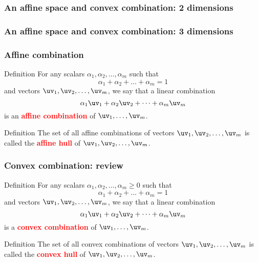 \begin{frame}
  \frametitle{An affine space and convex combination: 2 dimensions}
\end{frame}

\begin{frame}
  \frametitle{An affine space and convex combination: 3 dimensions}
\end{frame}

\begin{frame}
  \frametitle{Affine combination}
  
  \begin{block}{Definition}
    For any scalars $\alpha_1,\alpha_2,\ldots,\alpha_m$
    such that 
    \[
    \alpha_1 + \alpha_2 + \ldots + \alpha_m = 1
    \]
    and vectors $\uv_1,\uv_2,\ldots,\uv_m$, we say that a linear combination
    \[
    \alpha_1\uv_1 + \alpha_2\uv_2 + \cdots + \alpha_m \uv_m
    \]
    is an \textcolor{red}{\bf affine combination} of $\uv_1,\ldots,\uv_m$.
  \end{block}

  \pause

  \begin{block}{Definition}
    The set of all affine combinations of 
    vectors $\uv_1,\uv_2,\ldots,\uv_m$
    is called the \textcolor{red}{\bf affine hull} of
    $\uv_1,\uv_2,\ldots,\uv_m$.
  \end{block}

\end{frame}

\begin{frame}
  \frametitle{Convex combination: review}
  
  \begin{block}{Definition}
    For any scalars $\alpha_1,\alpha_2,\ldots,\alpha_m \geq 0$
    such that 
    \[
    \alpha_1 + \alpha_2 + \ldots + \alpha_m = 1
    \]
    and vectors $\uv_1,\uv_2,\ldots,\uv_m$, we say that a linear combination
    \[
    \alpha_1\uv_1 + \alpha_2\uv_2 + \cdots + \alpha_m \uv_m
    \]
    is a \textcolor{red}{\bf convex combination} of $\uv_1,\ldots,\uv_m$.
  \end{block}

  \begin{block}{Definition}
    The set of all convex combinations of 
    vectors $\uv_1,\uv_2,\ldots,\uv_m$
    is called the \textcolor{red}{\bf convex hull} of
    $\uv_1,\uv_2,\ldots,\uv_m$.
  \end{block}

\end{frame}


